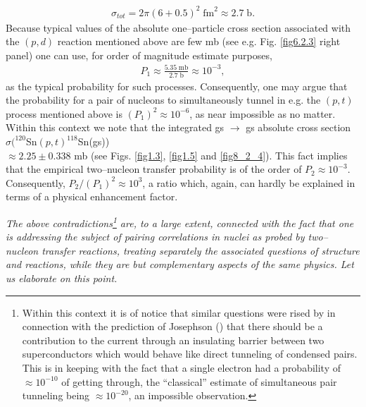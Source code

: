\begin{align}
\sigma_{tot}=2\pi(6+0.5)^2\;\text{fm}^2\approx 2.7\;\text{b}.
\end{align}
Because typical values of the absolute one--particle cross section associated  with the $(p,d)$ reaction mentioned above are few mb (see e.g. Fig. \ref{fig6.2.3} right panel) one can use, for order of magnitude estimate purposes,  
\begin{align}
P_1\approx\frac{5.35\; \text{mb}}{2.7\;\text{b}}\approx 10^{-3},
\end{align}
as the typical probability for such processes. Consequently, one may argue that the probability for a  pair of nucleons to simultaneously tunnel in e.g. the $(p,t)$ process mentioned above is $(P_1)^2\approx10^{-6}$, as near impossible as no matter. Within this context we note that the integrated gs $\rightarrow$ gs absolute cross section $\sigma(^{120}$Sn$(p,t)^{118}$Sn(gs))\\$\approx 2.25 \pm$0.338 mb (see Figs. \ref{fig1.3}, \ref{fig1.5} and \ref{fig8_2_4}). This fact implies that the empirical two--nucleon transfer probability is of the order of $P_2\approx 10^{-3}$. Consequently, $P_2/(P_1)^2\approx 10^{3}$, a ratio which, again, can hardly be explained in terms of a physical enhancement factor.


\textit{The above contradictions\footnote{Within this context it is of notice that similar questions were rised by \cite{Bardeen:62,Bardeen:61,Pippard:12,Cohen:62,McDonald:01} in connection with the prediction of Josephson (\cite{Josephson:62}) that there should be a contribution to the current through an insulating barrier between two superconductors which would behave like direct tunneling of condensed pairs. This is in keeping with the fact that a single electron had a probability of $\approx 10^{-10}$ of getting through, the ``classical'' estimate of simultaneous pair tunneling being $\approx 10^{-20}$, an impossible observation.}  are, to a large extent, connected with the fact that one is addressing the subject of pairing correlations in nuclei as probed by two--nucleon transfer reactions, treating separately the associated questions of structure and reactions, while they are but complementary aspects of the same physics. Let us elaborate on this point. }

